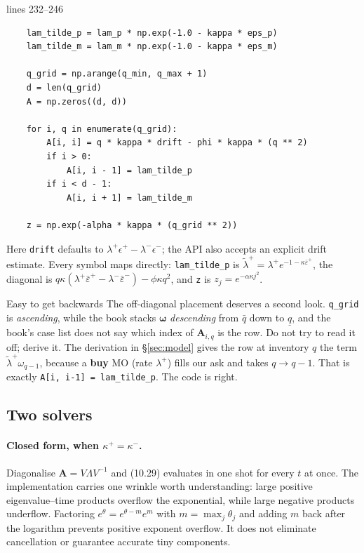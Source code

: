 \documentclass[11pt,a4paper]{article}
\newcommand{\epsb}{\bar{\varepsilon}}
\newcommand{\code}[1]{\texttt{\small #1}}
\newcommand{\snip}[3]{%
  \par\addvspace{6pt}\noindent
  {\footnotesize\color{NavyLink}\texttt{\detokenize{#1}}\quad lines #2--#3}%
  \par\nobreak\vspace{1pt}}
\begin{document}
\snip{scripts/hjb.py}{232}{246}
\begin{lstlisting}
    lam_tilde_p = lam_p * np.exp(-1.0 - kappa * eps_p)
    lam_tilde_m = lam_m * np.exp(-1.0 - kappa * eps_m)

    q_grid = np.arange(q_min, q_max + 1)
    d = len(q_grid)
    A = np.zeros((d, d))

    for i, q in enumerate(q_grid):
        A[i, i] = q * kappa * drift - phi * kappa * (q ** 2)
        if i > 0:
            A[i, i - 1] = lam_tilde_p
        if i < d - 1:
            A[i, i + 1] = lam_tilde_m

    z = np.exp(-alpha * kappa * (q_grid ** 2))
\end{lstlisting}

Here \code{drift} defaults to $\lambda^+\epsilon^+-\lambda^-\epsilon^-$;
the API also accepts an explicit drift estimate.
Every symbol maps directly: \code{lam\_tilde\_p} is $\tilde{\lambda}^{+} =
\lambda^{+}e^{-1-\kappa\epsb^{+}}$, the diagonal is
$q\kappa(\lambda^{+}\epsb^{+}-\lambda^{-}\epsb^{-}) - \phi\kappa q^{2}$, and
\code{z} is $z_j = e^{-\alpha\kappa j^{2}}$.

\begin{trap}{Easy to get backwards}
The off-diagonal placement deserves a second look. \code{q\_grid} is
\emph{ascending}, while the book stacks $\boldsymbol{\omega}$ \emph{descending}
from $\bar{q}$ down to $\underline{q}$, and the book's case list does not say
which index of $\mathbf{A}_{i,q}$ is the row. Do not try to read it off; derive
it. The derivation in \S\ref{sec:model} gives the row at inventory $q$ the term
$\tilde{\lambda}^{+}\omega_{q-1}$, because a \textbf{buy} MO (rate $\lambda^{+}$)
fills our ask and takes $q \to q-1$. That is exactly
\code{A[i, i-1] = lam\_tilde\_p}. The code is right.
\end{trap}

\subsection{Two solvers}

\paragraph{Closed form, when $\kappa^{+} = \kappa^{-}$.} Diagonalise
$\mathbf{A} = V\Lambda V^{-1}$ and (10.29) evaluates in one shot for
every $t$ at once. The implementation carries one wrinkle worth understanding:
large positive eigenvalue--time products overflow the exponential, while large
negative products underflow. Factoring $e^{\theta}=e^{\theta-m}e^m$ with
$m=\max_j\theta_j$ and adding $m$ back after the logarithm prevents positive
exponent overflow. It does not eliminate cancellation or guarantee accurate
tiny components.
\end{document}
